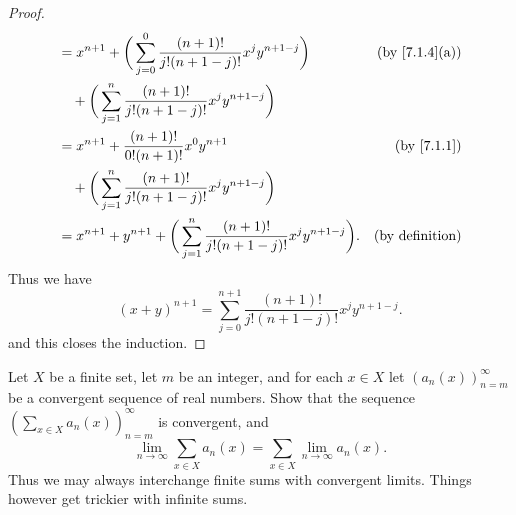 \begin{proof}
\begin{align*}
     & = x^{n + 1} + \bigg(\sum_{j = 0}^0 \frac{(n + 1)!}{j!(n + 1 - j)!} x^j y^{n + 1 - j}\bigg)                                  & \text{(by \cref{7.1.4}(a))} \\
     & \quad + \bigg(\sum_{j = 1}^n \frac{(n + 1)!}{j!(n + 1 - j)!} x^j y^{n + 1 - j}\bigg)                                                                      \\
     & = x^{n + 1} + \frac{(n + 1)!}{0! (n + 1)!} x^0 y^{n + 1}                                                                    & \text{(by \cref{7.1.1})}    \\
     & \quad + \bigg(\sum_{j = 1}^n \frac{(n + 1)!}{j!(n + 1 - j)!} x^j y^{n + 1 - j}\bigg)                                                                      \\
     & = x^{n + 1} + y^{n + 1} + \bigg(\sum_{j = 1}^n \frac{(n + 1)!}{j!(n + 1 - j)!} x^j y^{n + 1 - j}\bigg).                     & \text{(by definition)}
  \end{align*}
  Thus we have
  \[
    (x + y)^{n + 1} = \sum_{j = 0}^{n + 1} \frac{(n + 1)!}{j!(n + 1 - j)!} x^j y^{n + 1 - j}.
  \]
  and this closes the induction.
\end{proof}

\begin{ex}\label{ex:7.1.5}
  Let \(X\) be a finite set, let \(m\) be an integer, and for each \(x \in X\) let \((a_n(x))_{n = m}^\infty\) be a convergent sequence of real numbers.
  Show that the sequence \((\sum_{x \in X} a_n(x))_{n = m}^\infty\) is convergent, and
  \[
    \lim_{n \to \infty} \sum_{x \in X} a_n(x) = \sum_{x \in X} \lim_{n \to \infty} a_n(x).
  \]
  Thus we may always interchange finite sums with convergent limits.
  Things however get trickier with infinite sums.
\end{ex}


